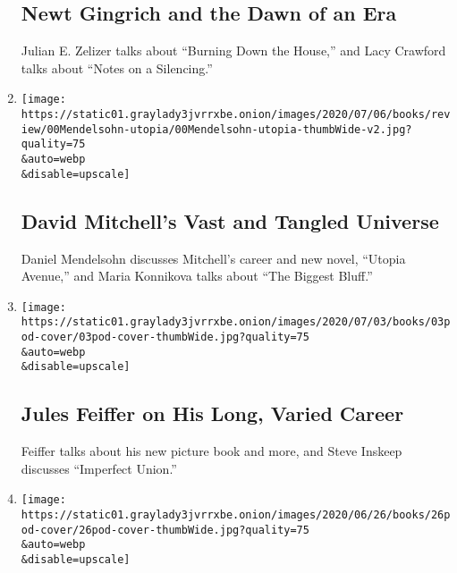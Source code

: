\begin{enumerate}
  \hypertarget{newt-gingrich-and-the-dawn-of-an-era}{%
  \subsection{Newt Gingrich and the Dawn of an
  Era}\label{newt-gingrich-and-the-dawn-of-an-era}}

  Julian E. Zelizer talks about ``Burning Down the House,'' and Lacy
  Crawford talks about ``Notes on a Silencing.''
\item
  \href{/2020/07/10/books/review/david-mitchell-utopia-avenue-daniel-mendelsohn-biggest-bluff-poker-maria-konnikova.html}{}

  \texttt{[image: https://static01.graylady3jvrrxbe.onion/images/2020/07/06/books/review/00Mendelsohn-utopia/00Mendelsohn-utopia-thumbWide-v2.jpg?quality=75\\\&auto=webp\\\&disable=upscale]}

  \hypertarget{david-mitchells-vast-and-tangled-universe}{%
  \subsection{David Mitchell's Vast and Tangled
  Universe}\label{david-mitchells-vast-and-tangled-universe}}

  Daniel Mendelsohn discusses Mitchell's career and new novel, ``Utopia
  Avenue,'' and Maria Konnikova talks about ``The Biggest Bluff.''
\item
  \href{/2020/07/03/books/review/podcast-jules-feiffer-smart-george-steve-inskeep-imperfect-union.html}{}

  \texttt{[image: https://static01.graylady3jvrrxbe.onion/images/2020/07/03/books/03pod-cover/03pod-cover-thumbWide.jpg?quality=75\\\&auto=webp\\\&disable=upscale]}

  \hypertarget{jules-feiffer-on-his-long-varied-career}{%
  \subsection{Jules Feiffer on His Long, Varied
  Career}\label{jules-feiffer-on-his-long-varied-career}}

  Feiffer talks about his new picture book and more, and Steve Inskeep
  discusses ``Imperfect Union.''
\item
  \href{/2020/06/26/books/review/podcast-richard-haass-world-brief-introduction.html}{}

  \texttt{[image: https://static01.graylady3jvrrxbe.onion/images/2020/06/26/books/26pod-cover/26pod-cover-thumbWide.jpg?quality=75\\\&auto=webp\\\&disable=upscale]}


\end{enumerate}
